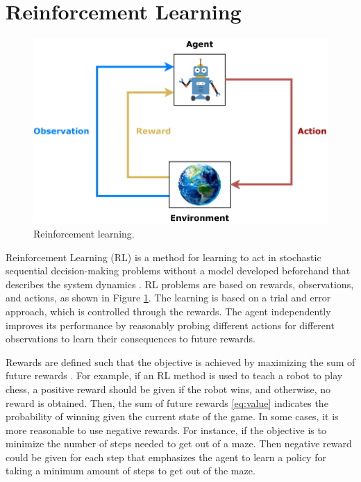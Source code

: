 \documentclass[english, 12pt, a4paper, elec, utf8, a-1b, online]{aaltothesis}
\begin{document}
\newpage
\section{Reinforcement Learning} \label{sec:RL}

\begin{figure}[b]
    \centering
    \includegraphics{figures/RL_diagram.pdf}
    \caption{Reinforcement learning.}
    \label{fig:RL_basics}
\end{figure}

Reinforcement Learning (RL) is a method for learning to act in stochastic sequential decision-making problems without a model developed beforehand that describes the system dynamics \cite{Sutton2018}.
RL problems are based on rewards, observations, and actions, as shown in Figure \ref{fig:RL_basics}.
The learning is based on a trial and error approach, which is controlled through the rewards.
The agent independently improves its performance by reasonably probing different actions for different observations to learn their consequences to future rewards.

Rewards are defined such that the objective is achieved by maximizing the sum of future rewards \cite{Sutton2018}.
For example, if an RL method is used to teach a robot to play chess, a positive reward should be given if the robot wins, and otherwise, no reward is obtained.
Then, the sum of future rewards \eqref{eq:value} indicates the probability of winning given the current state of the game.
In some cases, it is more reasonable to use negative rewards.
For instance, if the objective is to minimize the number of steps needed to get out of a maze. 
Then negative reward could be given for each step that emphasizes the agent to learn a policy for taking a minimum amount of steps to get out of the maze.
\end{document}
